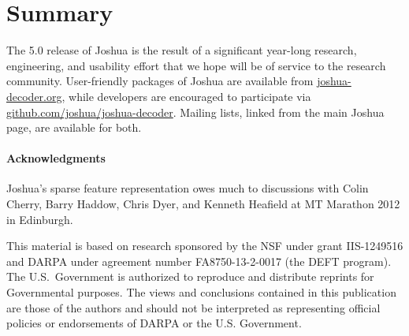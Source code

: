 \documentclass[11pt]{article}
\begin{document}
\section{Summary}

The 5.0 release of Joshua is the result of a significant year-long
research, engineering, and usability effort that we hope will be of
service to the research community. User-friendly packages of Joshua
are available from \url{joshua-decoder.org}, while developers are
encouraged to participate via
\url{github.com/joshua/joshua-decoder}. Mailing lists, linked from the
main Joshua page, are available for both.

\paragraph{Acknowledgments}

Joshua's sparse feature representation owes much to discussions with
Colin Cherry, Barry Haddow, Chris Dyer, and Kenneth Heafield at MT
Marathon 2012 in Edinburgh.

This material is based on research sponsored by the NSF under grant
IIS-1249516 and DARPA under agreement number FA8750-13-2-0017 (the
DEFT program).  The U.S.\ Government is authorized to reproduce and
distribute reprints for Governmental purposes.  The views and
conclusions contained in this publication are those of the authors and
should not be interpreted as representing official policies or
endorsements of DARPA or the U.S. Government.





\end{document}
